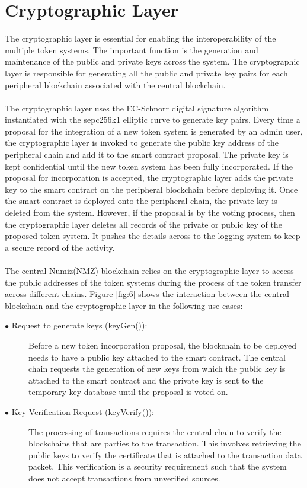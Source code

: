 \documentclass[a4paper,twoside,phd]{BYUPhys}
\begin{document}
\section{Cryptographic Layer}
The cryptographic layer is essential for enabling the interoperability of the multiple token systems. The important function is the generation and maintenance of the public and private keys across the system. The cryptographic layer is responsible for generating all the public and private key pairs for each peripheral blockchain associated with the central blockchain.
\\
\\
The cryptographic layer uses the EC-Schnorr digital signature algorithm instantiated with the sepc256k1 elliptic curve to generate key pairs. Every time a proposal for the integration of a new token system is generated by an admin user, the cryptographic layer is invoked to generate the public key address of the peripheral chain and add it to the smart contract proposal. The private key is kept confidential until the new token system has been fully incorporated. If the proposal for incorporation is accepted, the cryptographic layer adds the private key to the smart contract on the peripheral blockchain before deploying it. Once the smart contract is deployed onto the peripheral chain, the private key is deleted from the system. However, if the proposal is by the voting process, then the cryptographic layer deletes all records of the private or public key of the proposed token system. It pushes the details across to the logging system to keep a secure record of the activity.
\\
\\
The central Numiz(NMZ) blockchain relies on the cryptographic layer to access the public addresses of the token systems during the process of the token transfer across different chains. Figure \ref{fig:6} shows the interaction between the central blockchain and the cryptographic layer in the following use cases:
\begin{description}
    \item[$\bullet$ Request to generate keys (keyGen()):] Before a new token incorporation proposal, the blockchain to be deployed needs to have a public key attached to the smart contract. The central chain requests the generation of new keys from which the public key is attached to the smart contract and the private key is sent to the temporary key database until the proposal is voted on.
    \item[$\bullet$ Key Verification Request (keyVerify()):] The processing of transactions requires the central chain to verify the blockchains that are parties to the transaction. This involves retrieving the public keys to verify the certificate that is attached to the transaction data packet. This verification is a security requirement such that the system does not accept transactions from unverified sources. 
\end{description}
\end{document}
